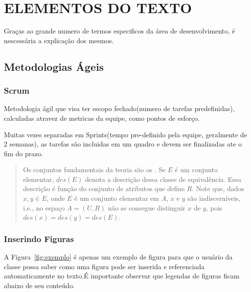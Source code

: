 \chapter{ELEMENTOS DO TEXTO}
\label{cap:elementos}

Graças ao grande numero de termos especificos da área de desenvolvimento, é nescessária a explicação dos mesmos.

\section{Metodologias Ágeis}

\subsection{Scrum}

Metodologia ágil que visa ter escopo fechado(numero de tarefas predefinidas), calculadas atravez de metricas da equipe, como pontos de esforço.

Muitas vezes separadas em Sprints(tempo pre-definido pela equipe, geralmente de 2 semanas), as tarefas são incluidas em um quadro e devem ser finalizadas ate o fim do prazo.

\begin{quote}
Os conjuntos fundamentais da teoria são os . Se $E$ é um conjunto elementar, $des(E)$ denota a descrição dessa classe de equivalência. Essa descrição é função do conjunto de atributos que define $R$. Note que, dados $x,y \in E$, onde $E$ é um conjunto elementar em $A$, $x$ e $y$ são indiscerníveis, i.e., no espaço $A=(U,R)$ não se consegue distinguir $x$ de $y$, pois $des(x) = des(y) = des(E)$. 
\end{quote}

\subsection{Inserindo Figuras}

A Figura~\ref{fig:exemplo} é apenas um exemplo de figura para que o usuário da classe possa saber como uma figura pode ser inserida e referenciada automaticamente no texto.É importante observar que legendas de figuras ficam abaixo de seu conteúdo.

